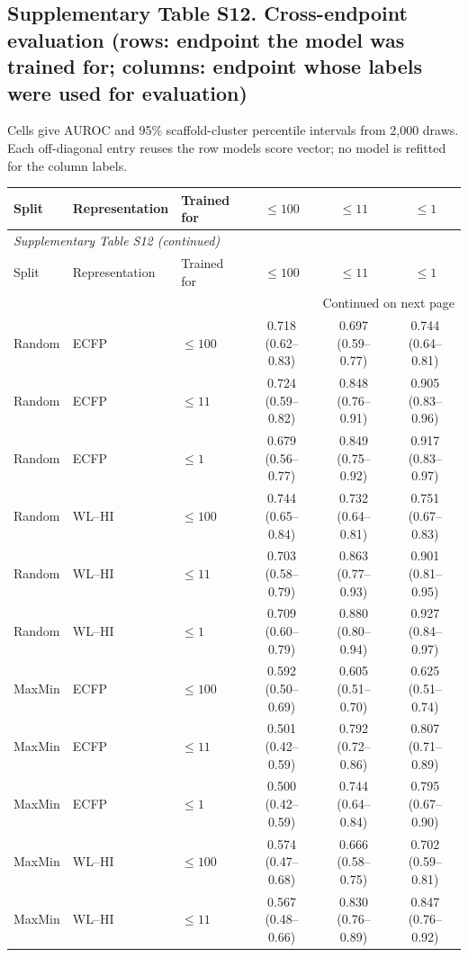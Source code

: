 \subsection*{Supplementary Table S12. Cross-endpoint evaluation (rows: endpoint the model was trained for; columns: endpoint whose labels were used for evaluation)}
Cells give AUROC and 95\% scaffold-cluster percentile intervals from 2,000 draws. Each off-diagonal entry reuses the row model\textquotesingle s score vector; no model is refitted for the column labels.
\begin{longtable}{lllccc}

\toprule Split & Representation & Trained for & $\leq100$ & $\leq11$ & $\leq1$ \\ \midrule\endfirsthead
\multicolumn{6}{l}{\textit{Supplementary Table S12 (continued)}} \\
\toprule Split & Representation & Trained for & $\leq100$ & $\leq11$ & $\leq1$ \\ \midrule\endhead
\midrule\multicolumn{6}{r}{Continued on next page}\\\endfoot
\bottomrule\endlastfoot
Random & ECFP & $\leq100$ & 0.718 (0.62--0.83) & 0.697 (0.59--0.77) & 0.744 (0.64--0.81) \\
Random & ECFP & $\leq11$ & 0.724 (0.59--0.82) & 0.848 (0.76--0.91) & 0.905 (0.83--0.96) \\
Random & ECFP & $\leq1$ & 0.679 (0.56--0.77) & 0.849 (0.75--0.92) & 0.917 (0.83--0.97) \\
\addlinespace
Random & WL--HI & $\leq100$ & 0.744 (0.65--0.84) & 0.732 (0.64--0.81) & 0.751 (0.67--0.83) \\
Random & WL--HI & $\leq11$ & 0.703 (0.58--0.79) & 0.863 (0.77--0.93) & 0.901 (0.81--0.95) \\
Random & WL--HI & $\leq1$ & 0.709 (0.60--0.79) & 0.880 (0.80--0.94) & 0.927 (0.84--0.97) \\
\addlinespace
MaxMin & ECFP & $\leq100$ & 0.592 (0.50--0.69) & 0.605 (0.51--0.70) & 0.625 (0.51--0.74) \\
MaxMin & ECFP & $\leq11$ & 0.501 (0.42--0.59) & 0.792 (0.72--0.86) & 0.807 (0.71--0.89) \\
MaxMin & ECFP & $\leq1$ & 0.500 (0.42--0.59) & 0.744 (0.64--0.84) & 0.795 (0.67--0.90) \\
\addlinespace
MaxMin & WL--HI & $\leq100$ & 0.574 (0.47--0.68) & 0.666 (0.58--0.75) & 0.702 (0.59--0.81) \\
MaxMin & WL--HI & $\leq11$ & 0.567 (0.48--0.66) & 0.830 (0.76--0.89) & 0.847 (0.76--0.92) \\

\end{longtable}
